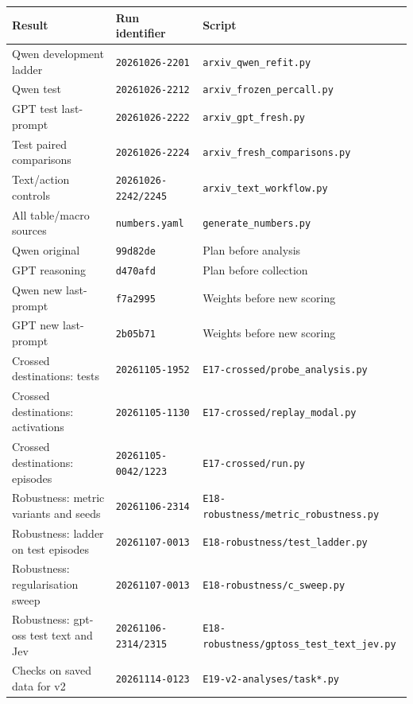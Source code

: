\begin{tabular}{lll}
\toprule
Result & Run identifier & Script \\
\midrule
Qwen development ladder & \texttt{20261026-2201} & \texttt{arxiv\_qwen\_refit.py} \\
Qwen test & \texttt{20261026-2212} & \texttt{arxiv\_frozen\_percall.py} \\
GPT test last-prompt & \texttt{20261026-2222} & \texttt{arxiv\_gpt\_fresh.py} \\
Test paired comparisons & \texttt{20261026-2224} & \texttt{arxiv\_fresh\_comparisons.py} \\
Text/action controls & \texttt{20261026-2242/2245} & \texttt{arxiv\_text\_workflow.py} \\
All table/macro sources & \texttt{numbers.yaml} & \texttt{generate\_numbers.py} \\
Qwen original & \texttt{99d82de} & Plan before analysis \\
GPT reasoning & \texttt{d470afd} & Plan before collection \\
Qwen new last-prompt & \texttt{f7a2995} & Weights before new scoring \\
GPT new last-prompt & \texttt{2b05b71} & Weights before new scoring \\
Crossed destinations: tests & \texttt{20261105-1952} & \texttt{E17-crossed/probe\_analysis.py} \\
Crossed destinations: activations & \texttt{20261105-1130} & \texttt{E17-crossed/replay\_modal.py} \\
Crossed destinations: episodes & \texttt{20261105-0042/1223} & \texttt{E17-crossed/run.py} \\
Robustness: metric variants and seeds & \texttt{20261106-2314} & \texttt{E18-robustness/metric\_robustness.py} \\
Robustness: ladder on test episodes & \texttt{20261107-0013} & \texttt{E18-robustness/test\_ladder.py} \\
Robustness: regularisation sweep & \texttt{20261107-0013} & \texttt{E18-robustness/c\_sweep.py} \\
Robustness: gpt-oss test text and Jev & \texttt{20261106-2314/2315} & \texttt{E18-robustness/gptoss\_test\_text\_jev.py} \\
Checks on saved data for v2 & \texttt{20261114-0123} & \texttt{E19-v2-analyses/task*.py} \\
\bottomrule
\end{tabular}
